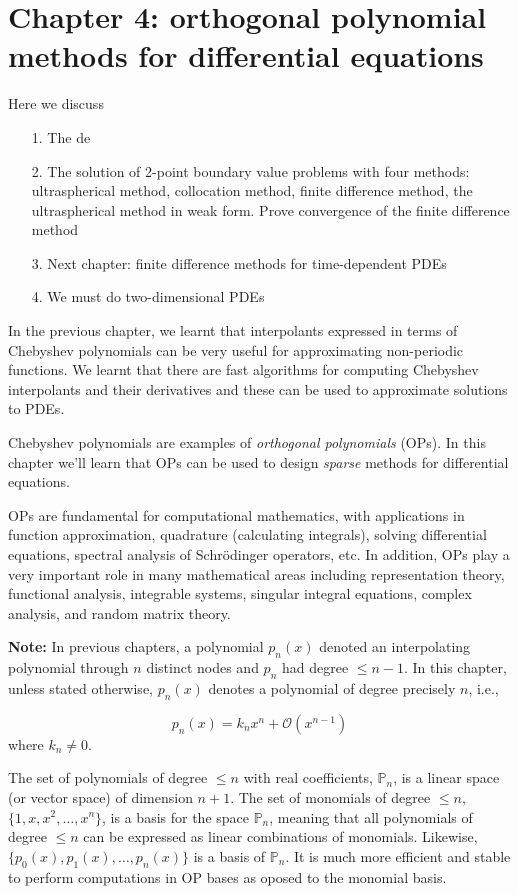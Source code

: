 \documentclass[12pt,a4paper]{article}
\begin{document}
\section{Chapter 4: orthogonal polynomial methods for differential equations}
Here we discuss

\begin{itemize}
\item[1. ] The de


\item[2. ] The solution of 2-point boundary value problems with four methods: ultraspherical method, collocation method, finite difference method, the ultraspherical method in weak form.  Prove convergence of the finite difference method


\item[3. ] Next chapter: finite difference methods for time-dependent PDEs


\item[4. ] We must do two-dimensional PDEs

\end{itemize}
In the previous chapter, we learnt that interpolants expressed in terms of Chebyshev polynomials can be very useful for approximating non-periodic functions.  We learnt that there are fast algorithms for computing Chebyshev interpolants and their derivatives and these can be used to approximate solutions to PDEs.

Chebyshev polynomials are examples of \emph{orthogonal polynomials} (OPs).  In this chapter we'll learn that OPs can be used to design \emph{sparse} methods for differential equations.

OPs are fundamental for computational mathematics, with applications in function approximation, quadrature (calculating integrals), solving differential equations, spectral analysis of Schrödinger operators, etc.  In addition, OPs play a very important role in many mathematical areas including representation theory, functional analysis, integrable systems, singular integral equations, complex analysis, and random matrix theory.

\textbf{Note:} In previous chapters, a polynomial $p_n(x)$ denoted an interpolating polynomial through $n$ distinct nodes and $p_n$ had degree $\leq n-1$.  In this chapter, unless stated otherwise, $p_n(x)$ denotes a polynomial of degree precisely $n$, i.e., 

\[
p_n(x) = k_n x^n + \mathcal{O}(x^{n-1})
\]
where $k_n \neq 0$.

The set of polynomials of degree $\leq n$ with real coefficients, $\mathbb{P}_n$, is a linear space (or vector space) of dimension $n+1$.  The set of  monomials of degree $\leq n$, $\lbrace 1, x, x^2, \ldots, x^n \rbrace$, is a basis for the space $\mathbb{P}_n$, meaning that all polynomials of degree $\leq n$ can be expressed as linear combinations of monomials.  Likewise, $\lbrace p_0(x), p_1(x), \ldots, p_n(x) \rbrace$ is a basis of $\mathbb{P}_n$.  It is much  more efficient and stable to perform computations in OP bases as oposed to the monomial basis.
\end{document}
